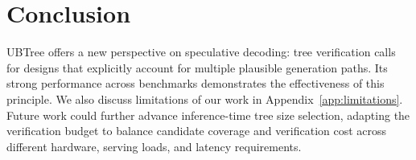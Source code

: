 \section{Conclusion}
UBTree offers a new perspective on speculative decoding: tree verification calls for designs that explicitly account for multiple plausible generation paths. Its strong performance across benchmarks demonstrates the effectiveness of this principle. We also discuss limitations of our work in Appendix~\ref{app:limitations}. Future work could further advance inference-time tree size selection, adapting the verification budget to balance candidate coverage and verification cost across different hardware, serving loads, and latency requirements. 
